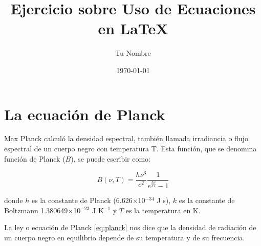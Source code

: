 \documentclass[12pt]{article}
\title{Ejercicio sobre Uso de Ecuaciones en \LaTeX}
\author{Tu Nombre}
\date{\today}
\begin{document}
\maketitle



\section{La ecuación de Planck}


Max Planck calculó la densidad espectral, también llamada irradiancia o flujo espectral de un cuerpo negro con temperatura T. Esta función, que se denomina función de Planck ($B$), se puede escribir como:

\begin{equation}
B(\nu,T)=\frac{h\nu^3}{c^2}\frac{1}{e^{\frac{h\nu}{kT}}-1}
\label{eq:planck}
\end{equation}

\noindent donde $h$ es la constante de Planck (6.626$\times$10$^{-34}$ J s), $k$
 es la constante de Boltzmann 1.380649$\times$10$^{-23}$ J K$^{-1}$ y $T$ es la temperatura en K. 
  
La ley o ecuación de Planck \eqref{eq:planck} nos dice que la densidad de radiación de un cuerpo negro en equilibrio depende de su temperatura y de su frecuencia.
\end{document}
